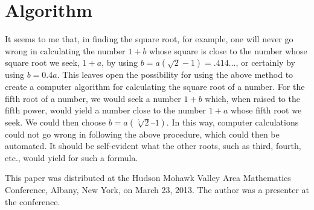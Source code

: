 \documentclass[12pt]{article}
\begin{document}
\section*{Algorithm}
It seems to me that, in finding the square root, for example, one will never go wrong in calculating the number $1 + b$ whose square is close to the number whose square root we seek, $1 + a$, by using $b = a (\sqrt{2} -1) = .414\ldots$, or certainly by using $b = 0.4a$.  This leaves open the possibility for using the above method to create  a computer algorithm for calculating the square root of a number. For the fifth root of a number, we would seek a number $1 + b$ which, when raised to the fifth power, would yield a number close to the number $1 + a$ whose fifth root we seek. We could then choose $b = a(\sqrt[5]{2} – 1)$. In this way, computer calculations could not go wrong in following the above procedure, which could then be automated. It should be self-evident what the other roots, such as third, fourth, etc., would yield for such a formula.

This paper was distributed at the Hudson Mohawk Valley Area Mathematics Conference, Albany, New York, on March 23, 2013. The author was a presenter at the conference.
\end{document}
